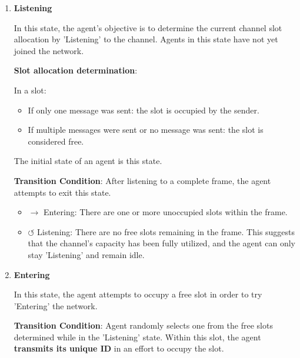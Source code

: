 \begin{enumerate}
    \item \textbf{Listening}
    

    In this state, the agent's objective is to determine the current channel slot allocation by 'Listening' to the channel. 
    Agents in this state have not yet joined the network.

        \textbf{Slot allocation determination}: 
        
        In a slot:
    \begin{itemize}
        \item If only one message was sent: the slot is occupied by the sender.
        \item If multiple messages were sent or no message was sent: the slot is considered free.
    \end{itemize}

    The initial state of an agent is this state.

    \textbf{Transition Condition}: After listening to a complete frame, the agent attempts to exit this state.
    \begin{itemize}
        \item $\rightarrow$ Entering: There are one or more unoccupied slots within the frame.
        \item $\circlearrowleft$ Listening: There are no free slots remaining in the frame. This suggests that the channel's capacity has been fully utilized, and the agent can only stay 'Listening' and remain idle.
    \end{itemize}
    
    \item \textbf{Entering}
    
    In this state, the agent attempts to occupy a free slot in order to try 'Entering' the network.

    \textbf{Transition Condition}: 
    Agent randomly selects one from the free slots determined while in the 'Listening' state.
    Within this slot, the agent \textbf{transmits its unique ID} in an effort to occupy the slot.


\end{enumerate}

